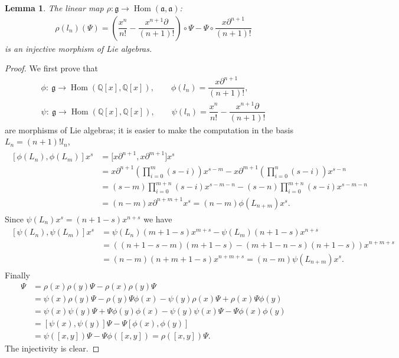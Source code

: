 \documentclass[11pt]{article}
\newcommand{\Hom}{\operatorname{Hom}}
\newcommand{\Q}{\mathbb{Q}}
\numberwithin{equation}{section}
\newtheorem{Lemma}[Theorem]{Lemma}
 { \theoremstyle{definition}
\newtheorem{Definition}[Theorem]{Definition}
\newtheorem{Example}[Theorem]{Example}
\newtheorem{Remark}[Theorem]{Remark} }
\begin{document}
\begin{Lemma} The linear map $\rho\colon \mathfrak{g}\to \Hom(\mathfrak{a},\mathfrak{a})$:
\begin{gather*} \rho(l_n)(\Psi)=\left(\dfrac{x^n}{n!}-\dfrac{x^{n+1}\partial}{(n+1)!}\right)\circ \Psi-
\Psi\circ \dfrac{x\partial^{n+1}}{(n+1)!}\end{gather*}
is an injective morphism of Lie algebras.
\end{Lemma}

\begin{proof}We f\/irst prove that
\begin{gather*} \phi\colon \ \mathfrak{g}\to \Hom(\Q[x],\Q[x]),\qquad
\phi(l_n)= \dfrac{x\partial^{n+1}}{(n+1)!} ,\\
 \psi\colon \ \mathfrak{g}\to \Hom(\Q[x],\Q[x]),\qquad
\psi(l_n)=\dfrac{x^n}{n!}-\dfrac{x^{n+1}\partial}{(n+1)!} \end{gather*}
are morphisms of Lie algebras; it is easier to make the computation in the basis $L_n=(n+1)! l_n$,
\begin{gather*} \begin{split}
[\phi(L_n),\phi(L_m)]x^s&=\big[x\partial^{n+1},x\partial^{m+1}\big]x^s\\
&=x\partial^{n+1}\left(\prod_{i=0}^{m}(s-i)\right)x^{s-m}-x\partial^{m+1}\left(\prod_{i=0}^{n}(s-i)\right)x^{s-n}\\
&=(s-m)\prod_{i=0}^{m+n}(s-i)x^{s-m-n}-(s-n)\prod_{i=0}^{m+n}(s-i)x^{s-m-n}\\
&=(n-m)x\partial^{n+m+1}x^s=(n-m)\phi(L_{n+m})x^s.\end{split}\end{gather*}
Since $\psi(L_n)x^s=(n+1-s)x^{n+s}$ we have
\begin{gather*}\begin{split}
[\psi(L_n),\psi(L_m)]x^s&=\psi(L_n)(m+1-s)x^{m+s}-\psi(L_m)(n+1-s)x^{n+s}\\
&=((n+1-s-m)(m+1-s)-(m+1-n-s)(n+1-s))x^{n+m+s}\\
&=(n-m)(n+m+1-s)x^{n+m+s}=(n-m)\psi(L_{n+m})x^s.\end{split}\end{gather*}
Finally
\begin{align*}
[\rho(x),\rho(y)]\Psi&=\rho(x)\rho(y)\Psi-\rho(x)\rho(y)\Psi\\
&=\psi(x)\rho(y)\Psi-\rho(y)\Psi\phi(x)-
\psi(y)\rho(x)\Psi+\rho(x)\Psi\phi(y)\\
&=\psi(x) \psi(y)\Psi+\Psi\phi(y)\phi(x)
-\psi(y)\psi(x)\Psi-\Psi\phi(x)\phi(y)\\
&=[\psi(x),\psi(y)]\Psi-\Psi[\phi(x),\phi(y)]\\
&=\psi([x,y])\Psi-\Psi\phi([x,y])=\rho([x,y])\Psi .
\end{align*}
The injectivity is clear.
\end{proof}
\end{document}
